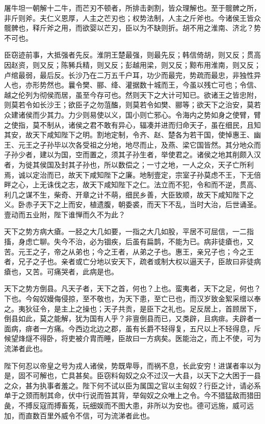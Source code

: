 \documentclass[12pt,UTF8]{ctexbook}
\begin{document}
屠牛坦一朝解十二牛，而芒刃不顿者，所排击剥割，皆众理解也。至于髋髀之所，非斤则斧。夫仁义恩厚，人主之芒刃也；权势法制，人主之斤斧也。今诸侯王皆众髋髀也，释斤斧之用，而欲婴以芒刃，臣以为不缺则折。胡不用之淮南、济北？势不可也。



臣窃迹前事，大抵强者先反。淮阴王楚最强，则最先反；韩信倚胡，则又反；贯高因赵资，则又反；陈豨兵精，则又反；彭越用梁，则又反；黥布用淮南，则又反；卢绾最弱，最后反。长沙乃在二万五千户耳，功少而最完，势疏而最忠，非独性异人也，亦形势然也。曩令樊、郦、绛、灌据数十城而王，今虽以残亡可也；令信、越之伦列为彻侯而居，虽至今存可也。然则天下之大计可知已。欲诸王之皆忠附，则莫若令如长沙王；欲臣子之勿菹醢，则莫若令如樊、郦等；欲天下之治安，莫若众建诸侯而少其力。力少则易使以义，国小则亡邪心。令海内之势如身之使臂，臂之使指，莫不制从，诸侯之君不敢有异心，辐凑并进而归命天子，虽在细民，且知其安，故天下咸知陛下之明。割地定制，令齐、赵、楚各为若干国，使悼惠王、幽王、元王之子孙毕以次各受祖之分地，地尽而止，及燕、梁它国皆然。其分地众而子孙少者，建以为国，空而置之，须其子孙生者，举使君之。诸侯之地其削颇入汉者，为徙其侯国及封其子孙也，所以数偿之；一寸之地，一人之众，天子亡所利焉，诚以定治而已，故天下咸知陛下之廉。地制壹定，宗室子孙莫虑不王，下无倍畔之心，上无诛伐之志，故天下咸知陛下之仁。法立而不犯，令和而不逆，贯高、利几之谋不生，柴奇、开章之计不萌，细民乡善，大臣致顺，故天下咸知陛下之义。卧赤子天下之上而安，植遗腹，朝委裘，而天下不乱，当时大治，后世诵圣。壹动而五业附，陛下谁惮而久不为此？



天下之势方病大瘡。一胫之大几如要，一指之大几如股，平居不可屈信，一二指搐，身虑亡聊。失今不治，必为锢疾，后虽有扁鹊，不能为已。病非徒瘡也，又苦。元王之子，帝之从弟也；今之王者，从弟之子也。惠王，亲兄子也；今之王者，兄子之子也。亲者或亡分地以安天下，疏者或制大权以逼天子，臣故曰非徒病瘡也，又苦。可痛哭者，此病是也。



天下之势方倒县。凡天子者，天下之首，何也？上也。蛮夷者，天下之足，何也？下也。今匈奴嫚侮侵掠，至不敬也，为天下患，至亡已也，而汉岁致金絮采缯以奉之。夷狄征令，是主上之操也；天子共贡，是臣下之礼也。足反居上，首顾居下，倒县如此，莫之能解，犹为国有人乎？非亶倒县而已，又类辟，且病痱。夫辟者一面病，痱者一方痛。今西边北边之郡，虽有长爵不轻得复，五尺以上不轻得息，斥候望烽燧不得卧，将吏被介胄而睡，臣故曰一方病矣。医能治之，而上不使，可为流涕者此也。



陛下何忍以帝皇之号为戎人诸侯，势既卑辱，而祸不息，长此安穷！进谋者率以为是，固不可解也，亡具甚矣。臣窃料匈奴之众不过汉一大县，以天下之大困于一县之众，甚为执事者羞之。陛下何不试以臣为属国之官以主匈奴？行臣之计，请必系单于之颈而制其命，伏中行说而笞其背，举匈奴之众唯上之令。今不猎猛敌而猎田彘，不搏反寇而搏畜菟，玩细娱而不图大患，非所以为安也。德可远施，威可远加，而直数百里外威令不信，可为流涕者此也。
\end{document}
